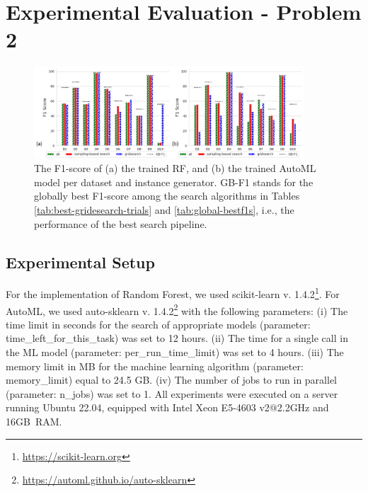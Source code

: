 \section{Experimental Evaluation - Problem 2}
\label{sec:expProblem2}

\begin{figure}[t]
    \centering
    \includegraphics[width=0.9\textwidth]{Nikoletos-paper/figures/Figure7.png}
    \caption{The F1-score of (a) the trained RF, and (b) the trained AutoML model per dataset and instance generator. GB-F1 stands for the globally best F1-score among the search algorithms in Tables \ref{tab:best-gridesearch-trials} and \ref{tab:global-bestf1s}, i.e., the performance of the best search pipeline.}
    \label{fig:rfAutoML}
\end{figure}
\subsection{Experimental Setup}\label{ssec:setup-p2}
For the implementation of Random Forest, we used scikit-learn v. 1.4.2\footnote{\underline{https://scikit-learn.org}}. 
For
AutoML, we used auto-sklearn v. 1.4.2\footnote{\underline{https://automl.github.io/auto-sklearn}} with the following parameters: (i) The time limit in seconds for the search of appropriate models (parameter: time\_left\_for\_this\_task) was set to 12 hours. (ii) The time for a single call in the ML model (parameter: per\_run\_time\_limit) was set to 4 hours. (iii) The memory limit in MB for the machine learning algorithm (parameter: memory\_limit) equal to  24.5 GB.
(iv) The number of jobs to run in parallel (parameter: n\_jobs) was set to 1.
All experiments were executed on a server running Ubuntu 22.04, equipped with Intel Xeon E5-4603 v2@2.2GHz and 16GB~RAM.



